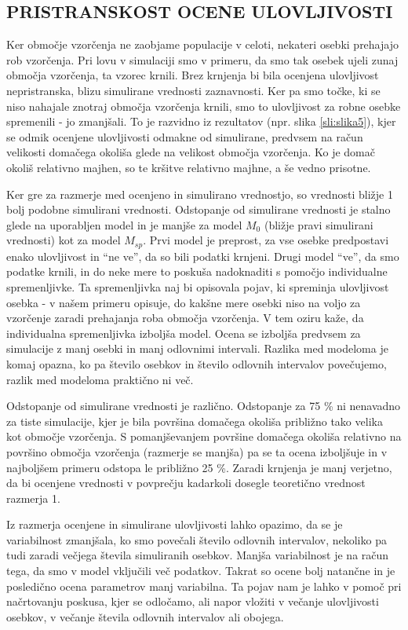 \subsection{PRISTRANSKOST OCENE ULOVLJIVOSTI}
Ker območje vzorčenja ne zaobjame populacije v celoti, nekateri osebki prehajajo rob vzorčenja. Pri lovu v simulaciji smo v primeru, da smo tak osebek ujeli zunaj območja vzorčenja, ta vzorec krnili. Brez krnjenja bi bila ocenjena ulovljivost nepristranska, blizu simulirane vrednosti zaznavnosti. Ker pa smo točke, ki se niso nahajale znotraj območja vzorčenja krnili, smo to ulovljivost za robne osebke spremenili - jo zmanjšali. To je razvidno iz rezultatov (npr. slika \ref{sli:slika5}), kjer se odmik ocenjene ulovljivosti odmakne od simulirane, predvsem na račun velikosti domačega okoliša glede na velikost območja vzorčenja. Ko je domač okoliš relativno majhen, so te kršitve relativno majhne, a še vedno prisotne.

Ker gre za razmerje med ocenjeno in simulirano vrednostjo, so vrednosti bližje 1 bolj podobne simulirani vrednosti. Odstopanje od simulirane vrednosti je stalno glede na uporabljen model in je manjše za model $M_0$ (bližje pravi simulirani vrednosti) kot za model $M_{sp}$.
Prvi model je preprost, za vse osebke predpostavi enako ulovljivost in ``ne ve'', da so bili podatki krnjeni. Drugi model ``ve'', da smo podatke krnili, in do neke mere to poskuša nadoknaditi s pomočjo individualne spremenljivke. Ta spremenljivka naj bi opisovala pojav, ki spreminja ulovljivost osebka - v našem primeru opisuje, do kakšne mere osebki niso na voljo za vzorčenje zaradi prehajanja roba območja vzorčenja. V tem oziru kaže, da individualna spremenljivka izboljša model. Ocena se izboljša predvsem za simulacije z manj osebki in manj odlovnimi intervali. Razlika med modeloma je komaj opazna, ko pa število osebkov in število odlovnih intervalov povečujemo, razlik med modeloma praktično ni več.

Odstopanje od simulirane vrednosti je različno. Odstopanje za 75 \% ni nenavadno za tiste simulacije, kjer je bila površina domačega okoliša približno tako velika kot območje vzorčenja. S pomanjševanjem površine domačega okoliša relativno na površino območja vzorčenja (razmerje se manjša) pa se ta ocena izboljšuje in v najboljšem primeru odstopa le približno 25 \%. Zaradi krnjenja je manj verjetno, da bi ocenjene vrednosti v povprečju kadarkoli dosegle teoretično vrednost razmerja 1.

Iz razmerja ocenjene in simulirane ulovljivosti lahko opazimo, da se je variabilnost zmanjšala, ko smo povečali število odlovnih intervalov, nekoliko pa tudi zaradi večjega števila simuliranih osebkov. Manjša variabilnost je na račun tega, da smo v model vključili več podatkov. Takrat so ocene bolj natančne in je posledično ocena parametrov manj variabilna. Ta pojav nam je lahko v pomoč pri načrtovanju poskusa, kjer se odločamo, ali napor vložiti v večanje ulovljivosti osebkov, v večanje števila odlovnih intervalov ali obojega.

